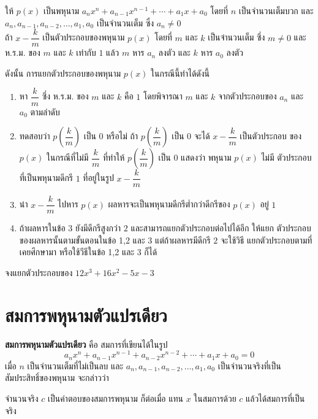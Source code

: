 \begin{theorembox}
	ให้ $p(x)$ เป็นพหุนาม $a_n x^n + a_{n-1} x^{n-1} + \cdots + a_1 x + a_0$ โดยที่ $n$ เป็นจำนวนเต็มบวก และ $a_n, a_{n-1}, a_{n-2}, \ldots, a_1, a_0$ เป็นจำนวนเต็ม ซึ่ง $a_n \neq 0$
	\\[0.5em]
	ถ้า $x - \dfrac{k}{m}$ เป็นตัวประกอบของพหุนาม $p(x)$ โดยที่ $m$ และ $k$ เป็นจำนวนเต็ม ซึ่ง $m \neq 0$ และ ห.ร.ม. ของ $m$ และ $k$ เท่ากับ $1$ แล้ว $m$ หาร $a_n$ ลงตัว และ $k$ หาร $a_0$ ลงตัว
\end{theorembox}

ดังนั้น การแยกตัวประกอบของพหุนาม $p(x)$ ในกรณีนี้ทำได้ดังนี้

\begin{conceptbox}
	\begin{enumerate}
		\item หา $\dfrac{k}{m}$ ซึ่ง ห.ร.ม. ของ $m$ และ $k$ คือ $1$ โดยพิจารณา $m$ และ $k$ จากตัวประกอบของ $a_n$ และ $a_0$ ตามลำดับ
		\item ทดสอบว่า $p\left(\dfrac{k}{m}\right)$ เป็น $0$ หรือไม่ ถ้า $p\left(\dfrac{k}{m}\right)$ เป็น $0$ จะได้ $x-\dfrac{k}{m}$ เป็นตัวประกอบ ของ $p(x)$ ในกรณีที่ไม่มี $\dfrac{k}{m}$ ที่ทำให้ $p\left(\dfrac{k}{m}\right)$ เป็น $0$ แสดงว่า พหุนาม $p(x)$ ไม่มี ตัวประกอบที่เป็นพหุนามดีกรี $1$ ที่อยู่ในรูป $x-\dfrac{k}{m}$
		\item นำ $x-\dfrac{k}{m}$ ไปหาร $p(x)$ ผลหารจะเป็นพหุนามดีกรีต่ำกว่าดีกรีของ $p(x)$ อยู่ $1$
		\item ถ้าผลหารในข้อ 3 ยังมีดีกรีสูงกว่า $2$ และสามารถแยกตัวประกอบต่อไปได้อีก ให้แยก ตัวประกอบของผลหารนั้นตามขั้นตอนในข้อ 1,2 และ 3 แต่ถ้าผลหารมีดีกรี $2$ จะใช้วิธี แยกตัวประกอบตามที่เคยศึกษามา หรือใช้วีธีในข้อ 1,2 และ 3 ก็ได้
	\end{enumerate}
\end{conceptbox}

\newpage
\begin{examplebox}
	จงแยกตัวประกอบของ $12x^3+16x^2-5x-3$
\end{examplebox}
\solution 
\newpage

\section{สมการพหุนามตัวแปรเดียว}

\begin{remarkbox}
	\textbf{สมการพหุนามตัวแปรเดียว} คือ สมการที่เขียนได้ในรูป
\begin{equation*}
	a_{n} x^{n} + a_{n-1} x^{n-1} + a_{n-2} x^{n-2} + \cdots + a_{1} x + a_{0} = 0
\end{equation*}
เมื่อ $n$ เป็นจำนวนเต็มที่ไม่เป็นลบ และ $a_{n}, a_{n-1}, a_{n-2}, \ldots, a_{1}, a_{0}$ เป็นจำนวนจริงที่เป็นสัมประสิทธิ์ของพหุนาม จะกล่าวว่า 
\begin{center}
	จำนวนจริง $c$ เป็นคำตอบของสมการพหุนาม ก็ต่อเมื่อ แทน $x$ ในสมการด้วย $c$ แล้วได้สมการที่เป็นจริง
\end{center}
\end{remarkbox}

